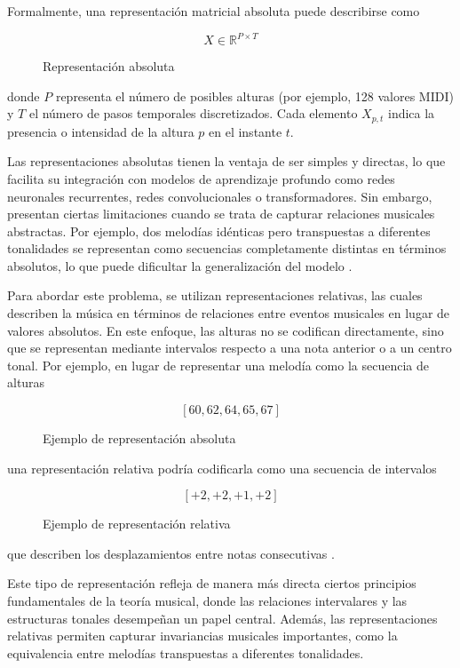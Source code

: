 \documentclass[12pt]{report}
\begin{document}
Formalmente, una representación matricial absoluta puede describirse como
\begin{figure}[h]
\centering
\[
X \in \mathbb{R}^{P \times T}
\]
\caption{Representación absoluta}
\end{figure}


donde $P$ representa el número de posibles alturas (por ejemplo, 128 valores MIDI) y $T$ el número de pasos temporales discretizados. Cada elemento $X_{p,t}$ indica la presencia o intensidad de la altura $p$ en el instante $t$.

Las representaciones absolutas tienen la ventaja de ser simples y directas, lo que facilita su integración con modelos de aprendizaje profundo como redes neuronales recurrentes, redes convolucionales o transformadores. Sin embargo, presentan ciertas limitaciones cuando se trata de capturar relaciones musicales abstractas. Por ejemplo, dos melodías idénticas pero transpuestas a diferentes tonalidades se representan como secuencias completamente distintas en términos absolutos, lo que puede dificultar la generalización del modelo \cite{huang2018music}.

Para abordar este problema, se utilizan representaciones relativas, las cuales describen la música en términos de relaciones entre eventos musicales en lugar de valores absolutos. En este enfoque, las alturas no se codifican directamente, sino que se representan mediante intervalos respecto a una nota anterior o a un centro tonal. Por ejemplo, en lugar de representar una melodía como la secuencia de alturas

\begin{figure}[h]
\centering
\[
[60, 62, 64, 65, 67]
\]
\caption{Ejemplo de representación absoluta}
\end{figure}


una representación relativa podría codificarla como una secuencia de intervalos

\begin{figure}[h]
\centering
\[
[+2, +2, +1, +2]
\]
\caption{Ejemplo de representación relativa}
\end{figure}


que describen los desplazamientos entre notas consecutivas \cite{conklin1995multiple}.

Este tipo de representación refleja de manera más directa ciertos principios fundamentales de la teoría musical, donde las relaciones intervalares y las estructuras tonales desempeñan un papel central. Además, las representaciones relativas permiten capturar invariancias musicales importantes, como la equivalencia entre melodías transpuestas a diferentes tonalidades.
\end{document}

